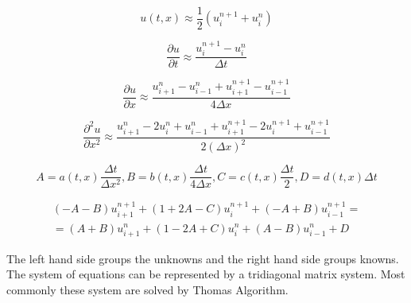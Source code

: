 \documentclass[12pt, oneside]{book}
\theoremstyle{plain}
\theoremstyle{definition}
\begin{document}
$$ u(t,x) \approx \frac{1}{2} ( u^{n+1}_i +  u^n_i) $$

$$   \frac{\partial u}{\partial t} \approx \frac{u^{n+1}_i - u^n_i}{\Delta t} $$

$$   \frac{\partial u}{\partial x} \approx \frac{u^n_{i+1} - u^n_{i-1} + u^{n+1}_{i+1} - u^{n+1}_{i-1}}{4\Delta x} $$

$$ \frac{\partial^2 u}{\partial x^2} \approx \frac{u^n_{i+1}- 2u^n_i + u^n_{i-1} + u^{n+1}_{i+1}- 2u^{n+1}_i + u^{n+1}_{i-1}}{2(\Delta x)^2} $$

$$ A = a(t,x) \frac{\Delta t}{\Delta x^2},  B = b(t,x) \frac{\Delta t}{4\Delta x}, C = c(t,x) \frac{\Delta t}{2},  D = d(t,x) \Delta t $$ 



\begin{multline}
 (-A -B) u^{n+1}_{i+1} + (1 + 2A - C) u^{n+1}_i + (-A + B) u^{n+1}_{i-1} =  \\
=  (A+B) u^{n}_{i+1} + (1 - 2A + C) u^{n}_i + (A - B) u^{n}_{i-1} + D
\end{multline}





The left hand side groups the unknowns and the right hand side groups knowns. The system of equations can be represented by a tridiagonal matrix system. Most commonly these system are solved by Thomas Algorithm.
\end{document}
